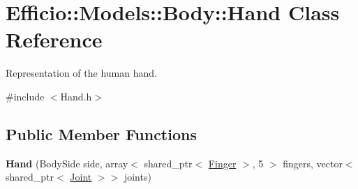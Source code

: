 \hypertarget{class_efficio_1_1_models_1_1_body_1_1_hand}{}\section{Efficio\+:\+:Models\+:\+:Body\+:\+:Hand Class Reference}
\label{class_efficio_1_1_models_1_1_body_1_1_hand}


Representation of the human hand.  




{\ttfamily \#include $<$Hand.\+h$>$}

\subsection*{Public Member Functions}
\begin{DoxyCompactItemize}
\item 
{\bfseries Hand} (Body\+Side side, array$<$ shared\+\_\+ptr$<$ \hyperlink{class_efficio_1_1_models_1_1_body_1_1_finger}{Finger} $>$, 5 $>$ fingers, vector$<$ shared\+\_\+ptr$<$ \hyperlink{class_efficio_1_1_models_1_1_body_1_1_joint}{Joint} $>$$>$ joints)\hypertarget{class_efficio_1_1_models_1_1_body_1_1_hand_ad4b6a661c324441c017785e94f2c59dc}{}\label{class_efficio_1_1_models_1_1_body_1_1_hand_ad4b6a661c324441c017785e94f2c59dc}

\end{DoxyCompactItemize}
